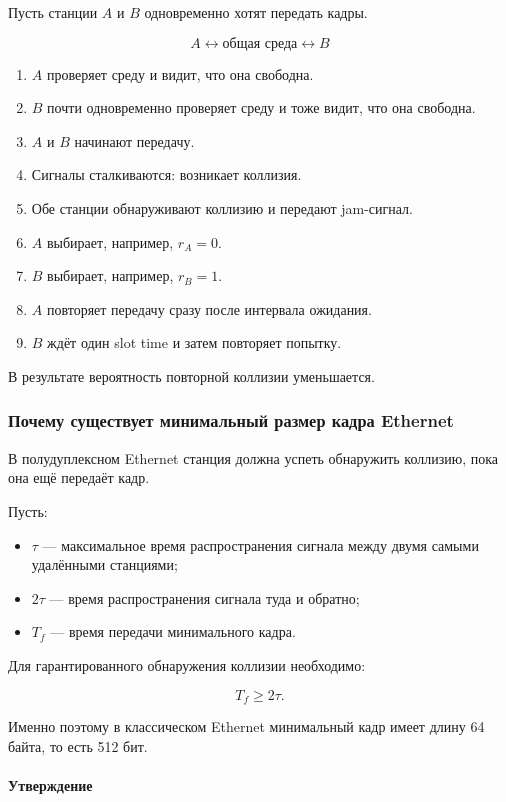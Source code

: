 \documentclass[12pt,a4paper]{article}
\begin{document}
Пусть станции $A$ и $B$ одновременно хотят передать кадры.

\[
A \longleftrightarrow \text{общая среда} \longleftrightarrow B
\]

\begin{enumerate}
    \item $A$ проверяет среду и видит, что она свободна.
    \item $B$ почти одновременно проверяет среду и тоже видит, что она свободна.
    \item $A$ и $B$ начинают передачу.
    \item Сигналы сталкиваются: возникает коллизия.
    \item Обе станции обнаруживают коллизию и передают jam-сигнал.
    \item $A$ выбирает, например, $r_A = 0$.
    \item $B$ выбирает, например, $r_B = 1$.
    \item $A$ повторяет передачу сразу после интервала ожидания.
    \item $B$ ждёт один slot time и затем повторяет попытку.
\end{enumerate}

В результате вероятность повторной коллизии уменьшается.

\subsubsection{Почему существует минимальный размер кадра Ethernet}

В полудуплексном Ethernet станция должна успеть обнаружить коллизию, пока она ещё передаёт кадр.

Пусть:
\begin{itemize}
    \item $\tau$ --- максимальное время распространения сигнала между двумя самыми удалёнными станциями;
    \item $2\tau$ --- время распространения сигнала туда и обратно;
    \item $T_f$ --- время передачи минимального кадра.
\end{itemize}

Для гарантированного обнаружения коллизии необходимо:

\[
T_f \geq 2\tau.
\]

Именно поэтому в классическом Ethernet минимальный кадр имеет длину 64 байта, то есть 512 бит.

\paragraph{Утверждение}
\end{document}

